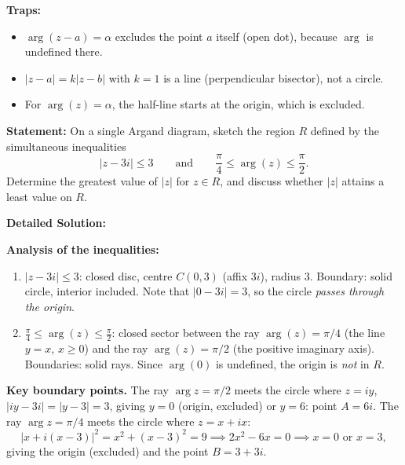 \documentclass[11pt]{article}
\begin{document}
\begin{methode}
\textbf{Traps:}
\begin{itemize}
    \item $\arg(z-a)=\alpha$ excludes the point $a$ itself (open dot), because $\arg$ is undefined there.
    \item $|z-a|=k|z-b|$ with $k=1$ is a line (perpendicular bisector), not a circle.
    \item For $\arg(z) = \alpha$, the half-line starts at the origin, which is excluded.
\end{itemize}
\end{methode}

\begin{exoresolu}
\textbf{Statement:} On a single Argand diagram, sketch the region $R$ defined by the simultaneous inequalities
\[
|z - 3i| \le 3 \qquad \text{and} \qquad \frac{\pi}{4} \le \arg(z) \le \frac{\pi}{2}.
\]
Determine the greatest value of $|z|$ for $z\in R$, and discuss whether $|z|$ attains a least value on $R$.

\tcblower
\textbf{Detailed Solution:}

\textbf{Analysis of the inequalities:}
\begin{enumerate}
    \item $|z - 3i| \le 3$: closed disc, centre $C(0,3)$ (affix $3i$), radius $3$. Boundary: solid circle, interior included. Note that $|0-3i|=3$, so the circle \emph{passes through the origin}.
    \item $\frac{\pi}{4} \le \arg(z) \le \frac{\pi}{2}$: closed sector between the ray $\arg(z)=\pi/4$ (the line $y=x$, $x\ge 0$) and the ray $\arg(z)=\pi/2$ (the positive imaginary axis). Boundaries: solid rays. Since $\arg(0)$ is undefined, the origin is \emph{not} in $R$.
\end{enumerate}

\textbf{Key boundary points.} The ray $\arg z=\pi/2$ meets the circle where $z=iy$, $|iy-3i|=|y-3|=3$, giving $y=0$ (origin, excluded) or $y=6$: point $A=6i$.
The ray $\arg z=\pi/4$ meets the circle where $z=x+ix$:
\[
|x+i(x-3)|^2 = x^2+(x-3)^2 = 9 \implies 2x^2-6x=0 \implies x=0 \text{ or } x=3,
\]
giving the origin (excluded) and the point $B=3+3i$.


\end{exoresolu}
\end{document}
